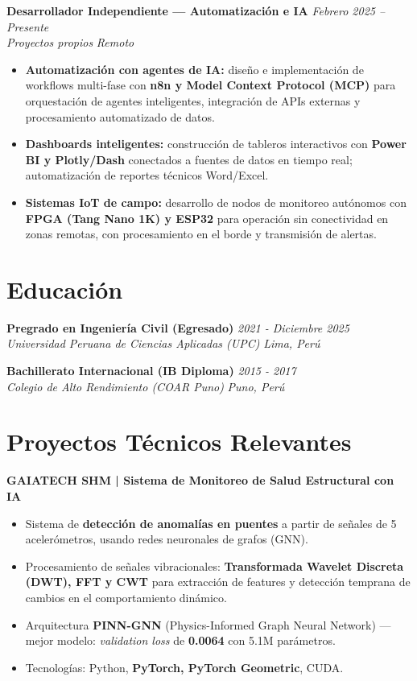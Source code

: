 \documentclass[10pt, a4paper]{article}
\newcommand{\entry}[4]{
    \textbf{#1} \hfill \textit{#2} \\
    \textit{#3} \hfill \textit{#4} \\
    \vspace{-1.5mm}
}
\begin{document}
\vspace{1mm}

\entry{Desarrollador Independiente — Automatización e IA}{Febrero 2025 – Presente}{Proyectos propios}{Remoto}
\begin{itemize}
    \item \textbf{Automatización con agentes de IA:} diseño e implementación de workflows multi-fase con \textbf{n8n y Model Context Protocol (MCP)} para orquestación de agentes inteligentes, integración de APIs externas y procesamiento automatizado de datos.
    \item \textbf{Dashboards inteligentes:} construcción de tableros interactivos con \textbf{Power BI y Plotly/Dash} conectados a fuentes de datos en tiempo real; automatización de reportes técnicos Word/Excel.
    \item \textbf{Sistemas IoT de campo:} desarrollo de nodos de monitoreo autónomos con \textbf{FPGA (Tang Nano 1K) y ESP32} para operación sin conectividad en zonas remotas, con procesamiento en el borde y transmisión de alertas.
\end{itemize}

\section*{Educación}
\entry{Pregrado en Ingeniería Civil (Egresado)}{2021 - Diciembre 2025}{Universidad Peruana de Ciencias Aplicadas (UPC)}{Lima, Perú}
\vspace{1mm}
\entry{Bachillerato Internacional (IB Diploma)}{2015 - 2017}{Colegio de Alto Rendimiento (COAR Puno)}{Puno, Perú}

\section*{Proyectos Técnicos Relevantes}

\textbf{GAIATECH SHM | Sistema de Monitoreo de Salud Estructural con IA}
\begin{itemize}
    \item Sistema de \textbf{detección de anomalías en puentes} a partir de señales de 5 acelerómetros, usando redes neuronales de grafos (GNN).
    \item Procesamiento de señales vibracionales: \textbf{Transformada Wavelet Discreta (DWT), FFT y CWT} para extracción de features y detección temprana de cambios en el comportamiento dinámico.
    \item Arquitectura \textbf{PINN-GNN} (Physics-Informed Graph Neural Network) — mejor modelo: \textit{validation loss} de \textbf{0.0064} con 5.1M parámetros.
    \item Tecnologías: Python, \textbf{PyTorch, PyTorch Geometric}, CUDA.
\end{itemize}
\end{document}
